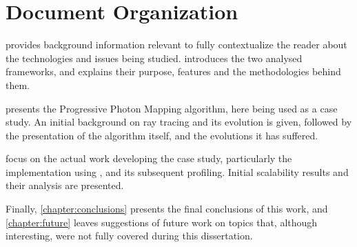\documentclass[main.tex]{subfiles}
\begin{document}
\section{Document Organization}

 provides background information relevant to fully contextualize the reader about the technologies and issues being studied.  introduces the two analysed frameworks, and explains their purpose, features and the methodologies behind them.

 presents the Progressive Photon Mapping algorithm, here being used as a case study. An initial background on ray tracing and its evolution is given, followed by the presentation of the algorithm itself, and the evolutions it has suffered.

 focus on the actual work developing the case study, particularly the implementation using \starpu, and its subsequent profiling. Initial scalability results and their analysis are presented.

Finally, \cref{chapter:conclusions} presents the final conclusions of this work, and \cref{chapter:future} leaves suggestions of future work on topics that, although interesting, were not fully covered during this dissertation.
\end{document}
